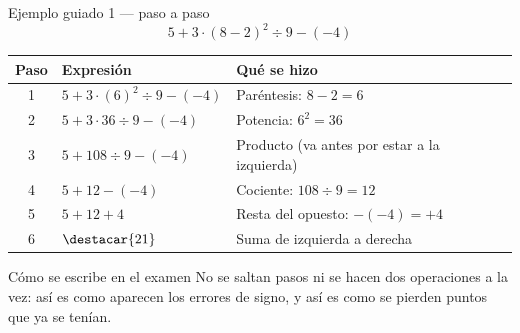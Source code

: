 \documentclass[aspectratio=169,10pt]{beamer}
\begin{document}
\begin{frame}{Ejemplo guiado 1 — paso a paso}
  \scriptsize
  \[ 5 + 3 \cdot (8-2)^2 \div 9 - (-4) \]

  \vspace{0.05cm}
  \begin{center}
  \begin{tabular}{@{}clp{5.6cm}@{}}
    \toprule
    \textbf{Paso} & \textbf{Expresión} & \textbf{Qué se hizo} \\
    \midrule
    1 & $5 + 3\cdot(6)^2 \div 9 - (-4)$ & Paréntesis: $8-2=6$ \\
    2 & $5 + 3\cdot 36 \div 9 - (-4)$   & Potencia: $6^2 = 36$ \\
    3 & $5 + 108 \div 9 - (-4)$         & Producto (va antes por estar a la izquierda) \\
    4 & $5 + 12 - (-4)$                 & Cociente: $108\div 9 = 12$ \\
    5 & $5 + 12 + 4$                    & Resta del opuesto: $-(-4) = +4$ \\
    6 & $\destacar{21}$                 & Suma de izquierda a derecha \\
    \bottomrule
  \end{tabular}
  \end{center}

  \vspace{0.1cm}
  \begin{alertblock}{Cómo se escribe en el examen}
    \tiny
     No se saltan pasos ni se hacen dos
    operaciones a la vez: así es como aparecen los errores de signo, y así es
    como se pierden puntos que ya se tenían.
  \end{alertblock}
\end{frame}
\end{document}
